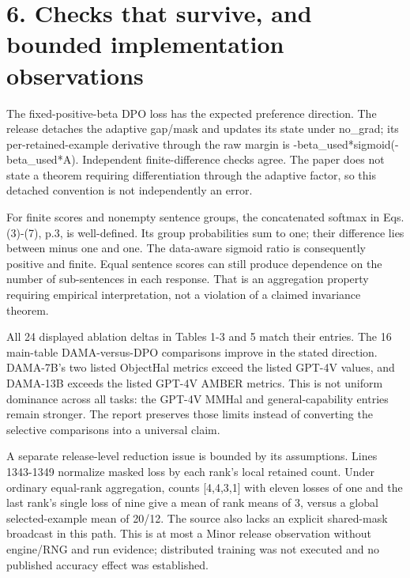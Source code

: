 \documentclass[10pt]{article}
\begin{document}
\section*{6. Checks that survive, and bounded implementation observations}
The fixed-positive-beta DPO loss has the expected preference direction. The release detaches the adaptive gap/mask and updates its state under no\_grad; its per-retained-example derivative through the raw margin is -beta\_used*sigmoid(-beta\_used*A). Independent finite-difference checks agree. The paper does not state a theorem requiring differentiation through the adaptive factor, so this detached convention is not independently an error.\par
For finite scores and nonempty sentence groups, the concatenated softmax in Eqs. (3)-(7), p.3, is well-defined. Its group probabilities sum to one; their difference lies between minus one and one. The data-aware sigmoid ratio is consequently positive and finite. Equal sentence scores can still produce dependence on the number of sub-sentences in each response. That is an aggregation property requiring empirical interpretation, not a violation of a claimed invariance theorem.\par
All 24 displayed ablation deltas in Tables 1-3 and 5 match their entries. The 16 main-table DAMA-versus-DPO comparisons improve in the stated direction. DAMA-7B’s two listed ObjectHal metrics exceed the listed GPT-4V values, and DAMA-13B exceeds the listed GPT-4V AMBER metrics. This is not uniform dominance across all tasks: the GPT-4V MMHal and general-capability entries remain stronger. The report preserves those limits instead of converting the selective comparisons into a universal claim.\par
A separate release-level reduction issue is bounded by its assumptions. Lines 1343-1349 normalize masked loss by each rank’s local retained count. Under ordinary equal-rank aggregation, counts [4,4,3,1] with eleven losses of one and the last rank’s single loss of nine give a mean of rank means of 3, versus a global selected-example mean of 20/12. The source also lacks an explicit shared-mask broadcast in this path. This is at most a Minor release observation without engine/RNG and run evidence; distributed training was not executed and no published accuracy effect was established.\par
\end{document}
